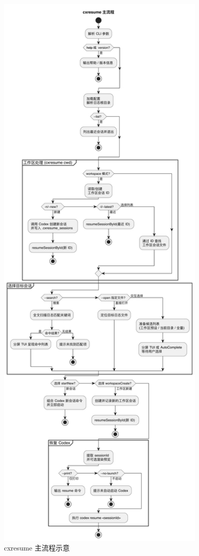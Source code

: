 \documentclass[12pt]{article}
\begin{document}
\begin{figure}[H]
  \centering
  \includegraphics[width=0.9\textwidth,height=0.9\textheight,keepaspectratio]{cxresume-flow-diagram.pdf}
  \caption{cxresume 主流程示意}
  \label{fig:flow}
\end{figure}
\end{document}

